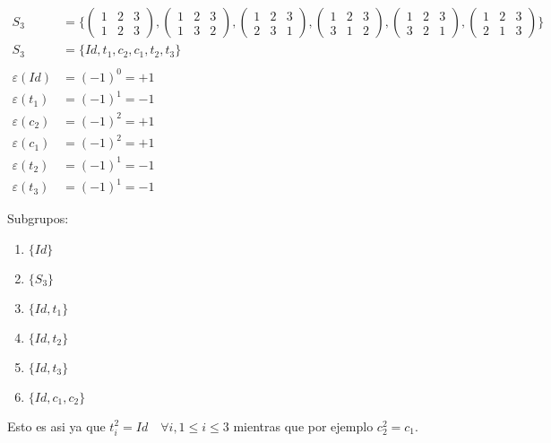 \begin{solution}
\begin{align}
S_3 &= \{ 
\begin{pmatrix} 
1 & 2 & 3 \\ 
1 & 2 & 3 
\end{pmatrix}, 
\begin{pmatrix} 
1 & 2 & 3 \\ 
1 & 3 & 2 
\end{pmatrix}, 
\begin{pmatrix} 
1 & 2 & 3 \\
2 & 3 & 1 
\end{pmatrix}, 
\begin{pmatrix} 
1 & 2 & 3 \\ 
3 & 1 & 2 
\end{pmatrix}, 
\begin{pmatrix} 
1 & 2 & 3 \\ 
3 & 2 & 1 
\end{pmatrix}, 
\begin{pmatrix} 
1 & 2 & 3 \\ 
2 & 1 & 3 
\end{pmatrix} 
\} \\
S_3 &= \{Id, t_1, c_2, c_1, t_2, t_3\} \\
\\
\varepsilon(Id)  &= (-1)^0 =+1\\
\varepsilon(t_1) &= (-1)^1 =-1\\
\varepsilon(c_2) &= (-1)^2 =+1\\
\varepsilon(c_1) &= (-1)^2 =+1\\
\varepsilon(t_2) &= (-1)^1 =-1\\
\varepsilon(t_3) &= (-1)^1 =-1
\end{align}

Subgrupos:
 \begin{enumerate}
 \item $\{Id\}$
 \item $\{S_3\}$
 \item $\{Id, t_1\}$
 \item $\{Id,t_2\}$
 \item $\{Id,t_3\}$
 \item $\{Id, c_1, c_2\}$
\end{enumerate}
Esto es asi ya que $t_i^2 = Id \quad \forall i, 1\leq i \leq 3 $ mientras que por ejemplo  $c_2^2= c_1$.
\end{solution}
